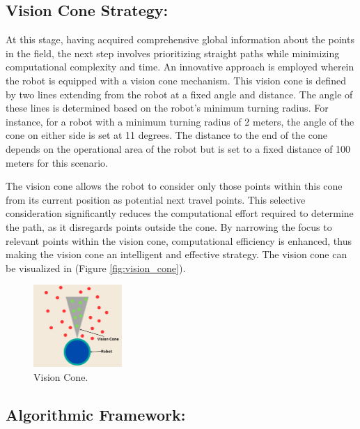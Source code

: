 \subsection{Vision Cone Strategy: }



At this stage, having acquired comprehensive global information about the points in the field, the next step involves prioritizing straight paths while minimizing computational complexity and time. An innovative approach is employed wherein the robot is equipped with a vision cone mechanism. This vision cone is defined by two lines extending from the robot at a fixed angle and distance. The angle of these lines is determined based on the robot's minimum turning radius. For instance, for a robot with a minimum turning radius of 2 meters, the angle of the cone on either side is set at 11 degrees. The distance to the end of the cone depends on the operational area of the robot but is set to a fixed distance of 100 meters for this scenario.

\vspace{3mm}  


The vision cone allows the robot to consider only those points within this cone from its current position as potential next travel points. This selective consideration significantly reduces the computational effort required to determine the path, as it disregards points outside the cone. By narrowing the focus to relevant points within the vision cone, computational efficiency is enhanced, thus making the vision cone an intelligent and effective strategy. The vision cone can be visualized in (Figure \autoref{fig:vision_cone}).

\begin{figure}[]
    \centering
    \includegraphics[width=0.3\textwidth]{Images/Algorithm_no_obs/Vision_cone.png}
    \caption{Vision Cone.}
    \label{fig:vision_cone}
\end{figure}

\subsection{Algorithmic Framework: }


